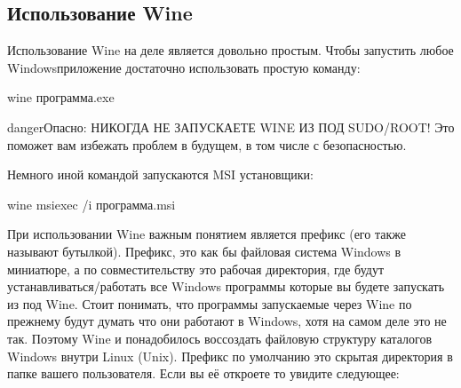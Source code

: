\documentclass[letterpaper,10pt,russian,openany]{sphinxmanual}
\begin{document}
\ignorespaces 

\subsection{Использование Wine}
\label{\detokenize{source/linux-gaming:wine-usage}}\label{\detokenize{source/linux-gaming:index-9}}\label{\detokenize{source/linux-gaming:id8}}
\sphinxAtStartPar
Использование Wine на деле является довольно простым.
Чтобы запустить любое Windows\sphinxhyphen{}приложение достаточно использовать простую команду:

\begin{sphinxVerbatim}[commandchars=\\\{\}]
wine программа.exe
\end{sphinxVerbatim}

\begin{sphinxadmonition}{danger}{Опасно:}
\sphinxAtStartPar
НИКОГДА НЕ ЗАПУСКАЕТЕ WINE ИЗ ПОД SUDO/ROOT! Это поможет вам избежать проблем в будущем, в том числе с безопасностью.
\end{sphinxadmonition}

\sphinxAtStartPar
Немного иной командой запускаются MSI установщики:

\begin{sphinxVerbatim}[commandchars=\\\{\}]
wine msiexec /i программа.msi
\end{sphinxVerbatim}

\sphinxAtStartPar
При использовании Wine важным понятием является префикс (его также называют бутылкой).
Префикс, это как бы файловая система Windows в миниатюре, а по совместительству это рабочая директория,
где будут устанавливаться/работать все Windows программы которые вы будете запускать из под Wine.
Стоит понимать, что программы запускаемые через Wine по прежнему будут думать что они работают в Windows, хотя на самом деле это не так.
Поэтому Wine и понадобилось воссоздать файловую структуру каталогов Windows внутри Linux (Unix).
Префикс по умолчанию \sphinxhyphen{} это скрытая директория  в папке вашего пользователя.
Если вы её откроете то увидите следующее:

\noindent{}
\end{document}
